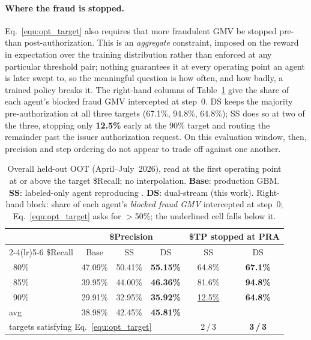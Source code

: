 \documentclass[11pt]{article}
\begin{document}
\paragraph{Where the fraud is stopped.} Eq.~\ref{equ:opt_target} also requires that more
fraudulent GMV be stopped pre- than post-authorization. This is an \emph{aggregate} constraint,
imposed on the reward in expectation over the training distribution rather than enforced at any
particular threshold pair; nothing guarantees it at every operating point an agent is later swept
to, so the meaningful question is how often, and how badly, a trained policy breaks it. The
right-hand columns of Table~\ref{tab:oot_overall} give the share of each agent's blocked fraud GMV
intercepted at step~0. DS keeps the majority pre-authorization at all three targets (67.1\%,
94.8\%, 64.8\%); SS does so at two of the three, stopping only \textbf{12.5\%} early at the 90\%
target and routing the remainder past the issuer authorization request. On this evaluation window,
then, precision and step ordering do not appear to trade off against one another.

\begin{table}[t]
\small
\centering
\setlength{\tabcolsep}{3pt}
\caption{Overall held-out OOT (April--July~2026), read at the first operating point at or above the
target \$Recall; no interpolation. \textbf{Base}: production GBM. \textbf{SS}: labeled-only agent
reproducing \citet{qu2025llmenhanced}. \textbf{DS}: dual-stream (this work). Right-hand block:
share of each agent's \emph{blocked fraud GMV} intercepted at step~0;
Eq.~\ref{equ:opt_target} asks for $>$50\%; the underlined cell falls below it.}
\label{tab:oot_overall}
\begin{tabular}{lccc@{\hskip 5pt}cc}
\toprule
 & \multicolumn{3}{c}{\$Precision} & \multicolumn{2}{c}{\$TP stopped at PRA} \\
\cmidrule(lr){2-4}\cmidrule(lr){5-6}
\$Recall & Base & SS & DS & SS & DS \\
\midrule
~80\% & 47.09\% & 50.41\% & \textbf{55.15\%} & 64.8\% & \textbf{67.1\%} \\
~85\% & 39.95\% & 44.00\% & \textbf{46.36\%} & 81.6\% & \textbf{94.8\%} \\
~90\% & 29.91\% & 32.95\% & \textbf{35.92\%} & \underline{12.5\%} & \textbf{64.8\%} \\
\midrule
avg & 38.98\% & 42.45\% & \textbf{45.81\%} & & \\
\multicolumn{4}{l}{targets satisfying Eq.~\ref{equ:opt_target}} & 2\,/\,3 & \textbf{3\,/\,3} \\
\bottomrule
\end{tabular}
\end{table}
\end{document}
